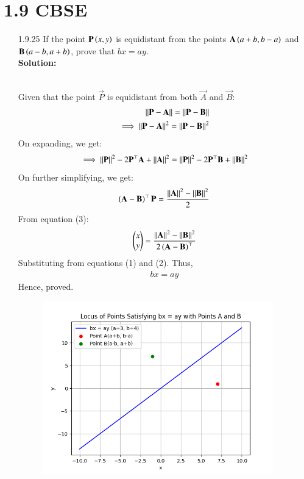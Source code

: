 \documentclass[journal]{IEEEtran}
\begin{document}
\section{1.9 CBSE}
\begin{enumerate}
\item [1.9.25] If the point $\mathbf{P}\left(x,y\right)$ is equidistant from the points $\mathbf{A}\left(a+b,b-a\right)$ and $\mathbf{B}\left(a-b,a+b\right)$, prove that $bx=ay$.\\
\textbf{Solution:}
\begin{table}[h!]    
      \centering
      
      \caption{}
    \end{table}\\
Given that the point $\vec{P}$ is equidistant from both $\vec{A}$ and $\vec{B}$:
\begin{align}
    \left\vert\left\vert\mathbf{P}-\mathbf{A}\right\vert\right\vert = \left\vert\left\vert\mathbf{P}-\mathbf{B}\right\vert\right\vert\\
    \implies {\left\vert\left\vert\mathbf{P}-\mathbf{A}\right\vert\right\vert}^2 = {\left\vert\left\vert\mathbf{P}-\mathbf{B}\right\vert\right\vert}^2
\end{align}
On expanding, we get:
\begin{align}
    \implies \left\vert\left\vert\mathbf{P}\right\vert\right\vert^2 - 2\mathbf{P}^\top\mathbf{A} + \left\vert\left\vert\mathbf{A}\right\vert\right\vert^2 = \left\vert\left\vert\mathbf{P}\right\vert\right\vert^2 - 2\mathbf{P}^\top\mathbf{B} + \left\vert\left\vert\mathbf{B}\right\vert\right\vert^2
\end{align}
On further simplifying, we get:
\begin{align}
    \left(\mathbf{A}-\mathbf{B}\right)^\top\mathbf{P} = \frac{\left\vert\left\vert\mathbf{A}\right\vert\right\vert^2 - \left\vert\left\vert\mathbf{B}\right\vert\right\vert^2}{2}\\
\end{align}
From equation (3):
\begin{align}
    \begin{pmatrix}x\\y\end{pmatrix} = \frac{\left\vert\left\vert\mathbf{A}\right\vert\right\vert^2 - \left\vert\left\vert\mathbf{B}\right\vert\right\vert^2}{2\left(\mathbf{A}-\mathbf{B}\right)^\top}
\end{align}
Substituting from equations (1) and (2). Thus,
\begin{align}
    bx = ay
\end{align}
Hence, proved.
\begin{figure}[htp]
    \centering
    \includegraphics[width=10cm]{figs/figure.png}
    \label{fig:figure}
\end{figure}
\end{enumerate}
\end{document}
